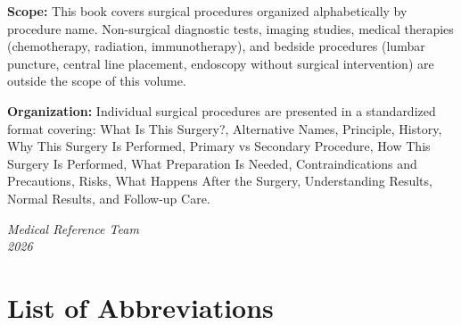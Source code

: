 \documentclass[12pt,oneside]{book}
\begin{document}
\textbf{Scope:} This book covers surgical procedures organized alphabetically by procedure name. Non-surgical diagnostic tests, imaging studies, medical therapies (chemotherapy, radiation, immunotherapy), and bedside procedures (lumbar puncture, central line placement, endoscopy without surgical intervention) are outside the scope of this volume.

\textbf{Organization:} Individual surgical procedures are presented in a standardized format covering: What Is This Surgery?, Alternative Names, Principle, History, Why This Surgery Is Performed, Primary vs Secondary Procedure, How This Surgery Is Performed, What Preparation Is Needed, Contraindications and Precautions, Risks, What Happens After the Surgery, Understanding Results, Normal Results, and Follow-up Care.

\vspace{1cm}
\noindent \textit{Medical Reference Team}\\\textit{2026}

\setcounter{tocdepth}{0}
\tableofcontents
\newpage

\chapter*{List of Abbreviations}
\end{document}
